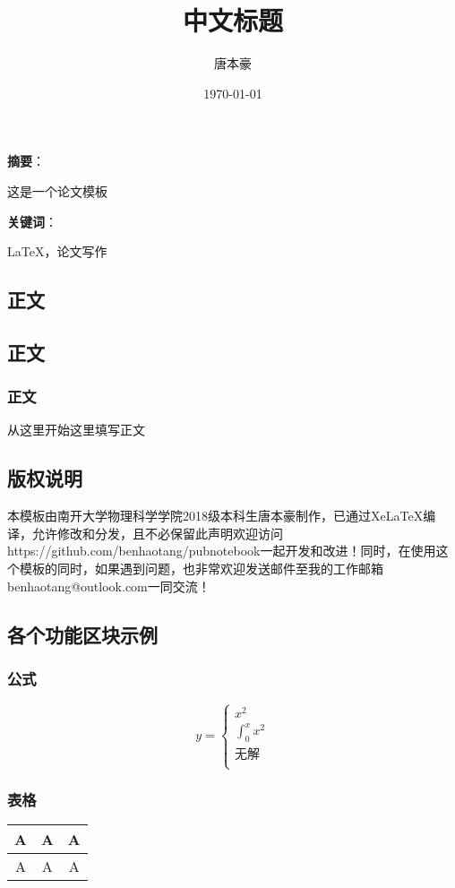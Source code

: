\documentclass{article}
\title{\vspace{-30mm}\Huge\heiti 中文标题}
\author[1]{唐本豪}
\affil[1]{南开大学物理科学学院,天津 300110,中国}
\date{\today}
\renewenvironment{abstract}{
	\textbf{摘要}：
}{\par}
\newenvironment{keyword}{
	\textbf{关键词}：
}{}
\begin{document}
\maketitle
\begin{abstract}
    这是一个论文模板
\end{abstract} 
\begin{keyword}
	\LaTeX{}，论文写作
\end{keyword}
\begin{multicols}{2}
\section{正文}
\subsection{正文}
\subsubsection{正文}
从这里开始这里填写正文\par
\subsection{版权说明}
本模板由南开大学物理科学学院2018级本科生唐本豪制作，已通过XeLaTeX编译，允许修改和分发，且不必保留此声明\cite{web}欢迎访问https://github.com/benhaotang/pubnotebook一起开发和改进！同时，在使用这个模板的同时，如果遇到问题，也非常欢迎发送邮件至我的工作邮箱benhaotang@outlook.com一同交流！
\subsection{各个功能区块示例}
\subsubsection{公式}
\begin{equation}
    y = \left\{ \begin{array}{c}
        x^2\\
        \int^x_0{x^2}\\
        \text{无解}\\
    \end{array} \right.
\end{equation}
\subsubsection{表格}
\begin{center}
    \begin{tabular}{ccc}
        \hline
		A & A & A \\ \hline
		A & A & A \\ \hline
  \end{tabular}
  \label{tab:haha}
\end{center}

\end{multicols}
\end{document}
